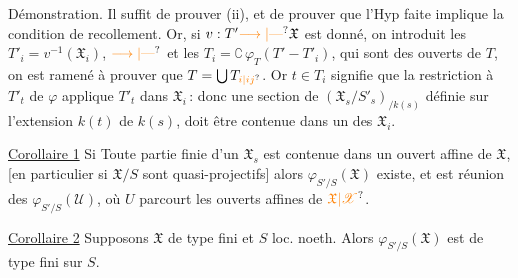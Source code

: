 Démonstration. Il suffit de prouver (ii), et  de prouver que l'Hyp faite implique la condition de recollement. Or,
si $v:T'\unsure{\longrightarrow|\text{---}}\mathfrak X$ est donné, on introduit les $T'_i=v^{-1}(\mathfrak X_i)$, $\unsure{\longrightarrow|\text{---}}$ et les $T_i=\complement\,\varphi_T(T'-T'_i)$, qui sont des ouverts de $T$, on est ramené à prouver que $T=\bigcup T_{\unsure{i|ij}}$.
 Or $t\in T_i$ signifie que la restriction à $T'_t$ de $\varphi$ applique $T'_t$ dans $\mathfrak X_i$\,: donc une section de $(\mathfrak X_s/S'_s)_{/k(s)}$ définie sur l'extension $k(t)$ de $k(s)$, doit être contenue dans un des $\mathfrak X_i$.

\uline{Corollaire 1} Si Toute partie  finie  d'un $\mathfrak X_s$ est contenue dans un ouvert affine de $\mathfrak X$,  [en particulier si  $\mathfrak X/S$  sont quasi-projectifs] alors $\varphi_{S'/S}(\mathfrak X)$ existe, et est
réunion des $\varphi_{S'/S}(\mathcal U)$, où $U$ parcourt les ouverts affines de $\unsure{\mathfrak X|\mathscr X}$.

\uline{Corollaire 2} Supposons   $\mathfrak X$ de type fini  et $S$ loc. noeth. Alors $\varphi_{S'/S}(\mathfrak X)$ est de type fini sur $S$.

